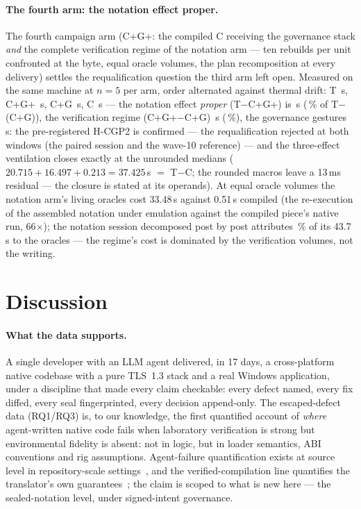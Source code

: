 \documentclass[10pt,a4paper]{article}
\begin{document}
\paragraph{The fourth arm: the notation effect proper.} The fourth
campaign arm (C+G+: the compiled C receiving the governance stack
\emph{and} the complete verification regime of the notation arm ---
ten rebuilds per unit confronted at the byte, equal oracle volumes,
the plan recomposition at every delivery) settles the requalification
question the third arm left open. Measured on the same machine at
$n{=}5$ per arm, order alternated against thermal drift: T
\quatreBrasT{}\,s, C+G+ \quatreBrasCGP{}\,s, C+G \quatreBrasCG{}\,s, C
\quatreBrasC{}\,s --- the notation effect \emph{proper} (T$-$C+G+) is
\effetNotationPropre{}\,s (\partNotationPropre\,\% of T$-$(C+G)), the
verification regime (C+G+$-$C+G) \effetRegime{}\,s (\partRegime\,\%),
the governance gestures \effetGouvernanceOnze{}\,s: the pre-registered
H-CGP2 is confirmed --- the requalification rejected at both windows
(the paired session and the wave-10 reference) --- and the
three-effect ventilation closes exactly at the unrounded medians
($20.715 + 16.497 + 0.213 = 37.425$\,s $=$ T$-$C; the rounded macros
leave a 13\,ms residual --- the closure is stated at its operands).
At equal oracle volumes the notation arm's living oracles cost 33.48\,s
against 0.51\,s compiled (the re-execution of the assembled notation
under emulation against the compiled piece's native run, 66$\times$);
the notation session decomposed post by post attributes \oraclesPart\,\%
of its 43.7\,s to the oracles --- the regime's cost is dominated by
the verification volumes, not the writing.



\section{Discussion}\label{sec:discussion}

\paragraph{What the data supports.} A single developer with an LLM agent
delivered, in 17 days, a cross-platform native codebase with a pure
TLS~1.3 stack and a real Windows application, under a discipline that
made every claim checkable: every defect named, every fix diffed, every
seal fingerprinted, every decision append-only. The escaped-defect data
(RQ1/RQ3) is, to our knowledge, the first quantified account of
\emph{where} agent-written native code fails when laboratory verification
is strong but environmental fidelity is absent: not in logic, but in
loader semantics, ABI conventions and rig assumptions. Agent-failure
quantification exists at source level in repository-scale
settings~\cite{yang2024sweagent}, and the verified-compilation line
quantifies the translator's own guarantees~\cite{leroycompcert}; the
claim is scoped to what is new here --- the sealed-notation level, under
signed-intent governance.
\end{document}

